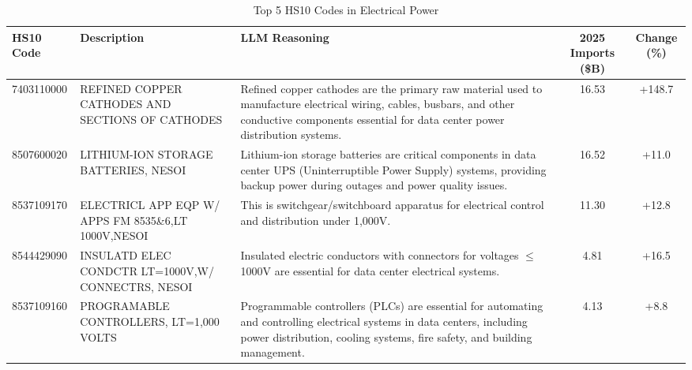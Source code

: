 \begin{table}[htbp]
\centering
\small
\caption{Top 5 HS10 Codes in Electrical Power}
\label{tab:top5_electrical_power}
\setlength{\tabcolsep}{1.25mm}
\renewcommand{\arraystretch}{1.80}
\begin{tabular}{lp{3.5cm}p{3.5cm}cc}
\toprule
HS10 Code & Description & LLM Reasoning & 2025 Imports (\$B) & Change (\%) \\
\midrule
7403110000 & {\footnotesize REFINED COPPER CATHODES AND SECTIONS OF CATHODES} & {\footnotesize Refined copper cathodes are the primary raw material used to manufacture electrical wiring, cables, busbars, and other conductive components essential for data center power distribution systems.} & 16.53 & +148.7 \\
8507600020 & {\footnotesize LITHIUM-ION STORAGE BATTERIES, NESOI} & {\footnotesize Lithium-ion storage batteries are critical components in data center UPS (Uninterruptible Power Supply) systems, providing backup power during outages and power quality issues.} & 16.52 & +11.0 \\
8537109170 & {\footnotesize ELECTRICL APP EQP W/ APPS FM 8535\&6,LT 1000V,NESOI} & {\footnotesize This is switchgear/switchboard apparatus for electrical control and distribution under 1,000V.} & 11.30 & +12.8 \\
8544429090 & {\footnotesize INSULATD ELEC CONDCTR LT=1000V,W/ CONNECTRS, NESOI} & {\footnotesize Insulated electric conductors with connectors for voltages $\leq$1000V are essential for data center electrical systems.} & 4.81 & +16.5 \\
8537109160 & {\footnotesize PROGRAMABLE CONTROLLERS, LT=1,000 VOLTS} & {\footnotesize Programmable controllers (PLCs) are essential for automating and controlling electrical systems in data centers, including power distribution, cooling systems, fire safety, and building management.} & 4.13 & +8.8 \\
\bottomrule
\end{tabular}
\end{table}

